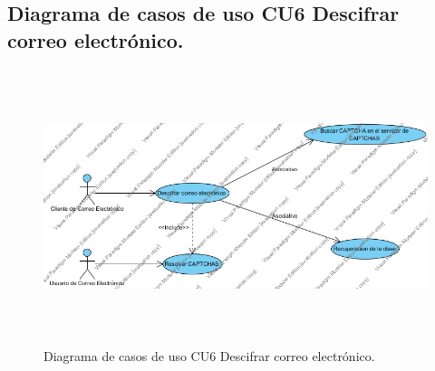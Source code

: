 \documentclass[12pt,oneside,onecolumn,openany]{report}
\begin{document}
\subsection{Diagrama de casos de uso CU6 Descifrar correo electrónico.}
\begin{figure}[H]
	\includegraphics[width=1\linewidth, height=8cm]{./images/casodeuso6.jpg}
	\caption{Diagrama de casos de uso CU6 Descifrar correo electrónico.}
	\label{fig:4-7-1}
\end{figure}
\end{document}
